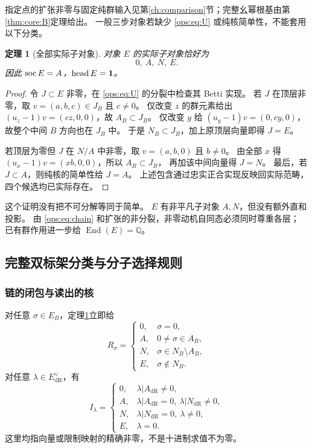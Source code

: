 \documentclass[11pt,a4paper,oneside]{ctexart}
\theoremstyle{cnplain}
\newtheorem{theorem}{定理}[section]
\theoremstyle{definition}
\theoremstyle{remark}
\newcommand{\Q}{\mathbb Q}
\newcommand{\End}{\operatorname{End}}
\newcommand{\dR}{\mathrm{dR}}
\numberwithin{equation}{section}
\begin{document}
指定点的扩张非零与固定纯群输入见第\ref{ch:comparison}节；完整幺幂根基由第\ref{thm:core:B}定理给出。
一般三步对象若缺少 \eqref{ops:eq:U} 或纯核简单性，不能套用以下分类。

\begin{theorem}[全部实际子对象]\label{ops:thm:uniserial}
对象 $E$ 的实际子对象恰好为
\begin{equation}\label{ops:eq:chain}
                        0,\ A,\ N,\ E.
\end{equation}
因此 $\operatorname{soc} E=A$，$\operatorname{head} E=\mathbf1$。
\end{theorem}
\begin{proof}
令 $J\subset E$ 非零，在 \eqref{ops:eq:U} 的分裂中检查其 Betti 实现。
若 $J$ 在顶层非零，取 $v=(a,b,c)\in J_B$ 且 $c\ne0$。
仅改变 $z$ 的群元素给出 $(u_z-1)v=(cz,0,0)$，故 $A_B\subset J_B$。
仅改变 $y$ 给 $(u_y-1)v=(0,cy,0)$，故整个中间 $B$ 方向也在 $J_B$ 中。
于是 $N_B\subset J_B$，加上原顶层向量即得 $J=E$。

若顶层为零但 $J$ 在 $N/A$ 中非零，取 $v=(a,b,0)$ 且 $b\ne0$。
由全部 $x$ 得 $(u_x-1)v=(xb,0,0)$，所以 $A_B\subset J_B$，
再加该中间向量得 $J=N$。
最后，若 $J\subset A$，则纯核的简单性给 $J=A$。
上述包含通过忠实正合实现反映回实际范畴，四个候选均已实际存在。
\end{proof}

这个证明没有把不可分解等同于简单。
$E$ 有非平凡子对象 $A,N$，但没有额外直和投影。
由 \eqref{ops:eq:chain} 和扩张的非分裂，非零动机自同态必须同时尊重各层；
已有群作用进一步给 $\End(E)=\Q$。


\subsection{完整双标架分类与分子选择规则}
\subsubsection{链的闭包与读出的核}
对任意 $\sigma\in E_B$，定理\ref{ops:thm:uniserial}立即给
\begin{equation}\label{ops:eq:Rlevels}
 R_\sigma=
 \begin{cases}
 0,&\sigma=0,\\
 A,&0\ne\sigma\in A_B,\\
 N,&\sigma\in N_B\setminus A_B,\\
 E,&\sigma\notin N_B.
 \end{cases}
\end{equation}
对任意 $\lambda\in E_{\dR}^{\vee}$，有
\begin{equation}\label{ops:eq:Ilevels}
 I_\lambda=
 \begin{cases}
 0,&\lambda|A_{\dR}\ne0,\\
 A,&\lambda|A_{\dR}=0,\ \lambda|N_{\dR}\ne0,\\
 N,&\lambda|N_{\dR}=0,\ \lambda\ne0,\\
 E,&\lambda=0.
 \end{cases}
\end{equation}
这里均指向量或限制映射的精确非零，不是十进制求值不为零。
\end{document}

